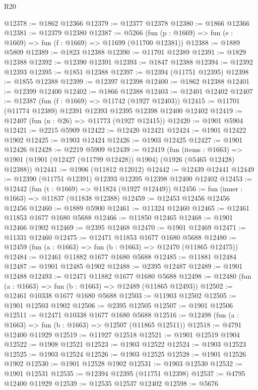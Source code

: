 \begin{lexlean}{R20}
\begin{coremodule}
@12378 := @1862 @12366
@12379 := @12377 @12378
@12380 := @1866 @12366
@12381 := @12379 @12380
@12387 := @5266 (fun (p : @1669) => fun (e : @1669) => fun (f : @1669) => @11699 (@11700 @12381))
@12388 := @1889 @5809
@12389 := @1823 @12388
@12390 := @11701 @12389
@12391 := @1829 @12388
@12392 := @12390 @12391
@12393 := @1847 @12388
@12394 := @12392 @12393
@12395 := @1851 @12388
@12397 := @12394 (@11751 @12395)
@12398 := @1855 @12388
@12399 := @12397 @12398
@12400 := @1862 @12388
@12401 := @12399 @12400
@12402 := @1866 @12388
@12403 := @12401 @12402
@12407 := @12387 (fun (f : @1669) => @11742 (@1927 @12403))
@12415 := @11701 (@11774 @12389) @12391 @12393 @12395 @12398 @12400 @12402
@12419 := @12407 (fun (n : @26) => @11773 (@1927 @12415))
@12420 := @1901 @5904
@12421 := @2215 @5909
@12422 := @12420 @12421
@12424 := @1901 @12422 @1902
@12425 := @1903 @12424
@12426 := @1903 @12425
@12427 := @1901 @12426
@12428 := @2219 @5909
@12439 := @12419
    (fun (items : @1663) =>
    @1901 (@1901 (@12427 (@11799 @12428)) @1904) (@1926 (@5465 @12428) @12388))
@12441 := @1906 (@11812 @12012)
@12442 := @12439 @12441
@12449 := @12390 (@11751 @12391) @12393 @12395 @12398 @12400 @12402
@12453 := @12442 (fun (t : @1669) => @11824 (@1927 @12449))
@12456 := fun (inner : @1663) => @11837 (@11838 @12388)
@12459 := @12453 @12456 @12456 @12456
@12460 := @1889 @5900
@12461 := @11324 @12460
@12465 := @12461 @11853 @1677 @1680 @5688
@12466 := @11850 @12465
@12468 := @1901 @12466 @1902
@12469 := @2395 @12468
@12470 := @1901 @12469
@12471 := @11331 @12460
@12475 := @12471 @11853 @1677 @1680 @5688
@12480 := @12459 (fun (a : @1663) => fun (b : @1663) => @12470 (@11865 @12475))
@12484 := @12461 @11882 @1677 @1680 @5688
@12485 := @11881 @12484
@12487 := @1901 @12485 @1902
@12488 := @2395 @12487
@12489 := @1901 @12488
@12493 := @12471 @11882 @1677 @1680 @5688
@12498 := @12480 (fun (a : @1663) => fun (b : @1663) => @12489 (@11865 @12493))
@12502 := @12461 @10338 @1677 @1680 @5688
@12503 := @11903 @12502
@12505 := @1901 @12503 @1902
@12506 := @2395 @12505
@12507 := @1901 @12506
@12511 := @12471 @10338 @1677 @1680 @5688
@12516 := @12498 (fun (a : @1663) => fun (b : @1663) => @12507 (@11865 @12511))
@12518 := @4791 @12400 @11929
@12519 := @11927 @12518
@12521 := @1901 @12519 @1904
@12522 := @1908 @12521
@12523 := @1903 @12522
@12524 := @1903 @12523
@12525 := @1903 @12524
@12526 := @1903 @12525
@12528 := @1901 @12526 @1902
@12530 := @1901 @12528 @1902
@12531 := @1903 @12530
@12532 := @1901 @12531
@12535 := @12394 @12395 (@11751 @12398)
@12537 := @4795 @12400 @11929
@12539 := @12535 @12537 @12402
@12598 := @5676

\end{coremodule}
\end{lexlean}
